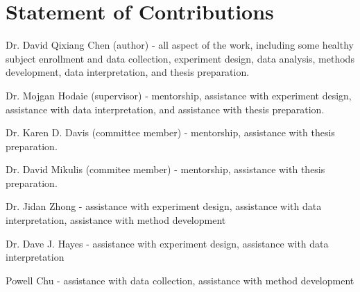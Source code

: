 \chapter{Statement of Contributions}

{\parskip=12pt
\noindent
Dr. David Qixiang Chen (author) - all aspect of the work, including some healthy subject enrollment and data collection, experiment design, data analysis, methods development, data interpretation, and thesis preparation.

\noindent
Dr. Mojgan Hodaie (supervisor) - mentorship, assistance with experiment design, assistance with data interpretation, and assistance with thesis preparation. 

\noindent
Dr. Karen D. Davis (committee member) - mentorship, assistance with thesis preparation.

\noindent
Dr. David Mikulis (commitee member) - mentorship, assistance with thesis preparation.

\noindent
Dr. Jidan Zhong - assistance with experiment design, assistance with data interpretation, assistance with method development

\noindent
Dr. Dave J. Hayes - assistance with experiment design, assistance with data interpretation

\noindent
Powell Chu - assistance with data collection, assistance with method development
}